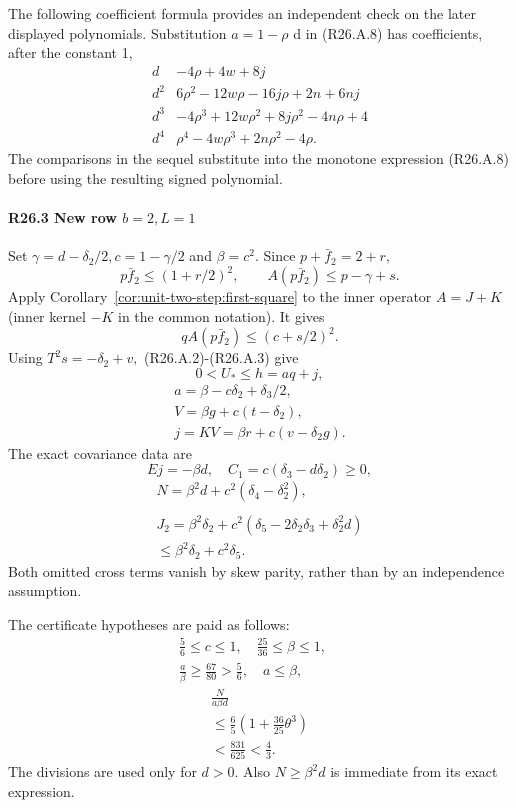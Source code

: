 The following coefficient formula provides an independent check on the
later displayed polynomials. Substitution \(a=1-\rho\) d in (R26.A.8) has
coefficients, after the constant 1,
\[
\begin{array}{c|l}
d&-4\rho+4w+8j\\
d^2&6\rho^2-12w\rho-16j\rho+2n+6nj\\
d^3&-4\rho^3+12w\rho^2+8j\rho^2-4n\rho+4\\
d^4&\rho^4-4w\rho^3+2n\rho^2-4\rho .
\end{array}                                                        \tag{R26.A.9}
\]
The comparisons in the sequel substitute into the monotone expression
(R26.A.8) before using the resulting signed polynomial.

\paragraph{R26.3 New row \(b=2,\allowbreak  L=1\)}\label{part:R26.3}

Set \(\gamma=d-\delta_2/2,\allowbreak  c=1-\gamma/2\) and \(\beta=c^2.\) Since \(p+\bar f_2=2+r,\allowbreak \)
\[
p\bar f_2\le(1+r/2)^2,\qquad
A(p\bar f_2)\le p-\gamma+s.
\]
Apply Corollary~\ref{cor:unit-two-step:first-square} to the inner
operator $A=J+K$ (inner kernel $-K$ in the common notation). It gives
\[
qA(p\bar f_2)\le(c+s/2)^2.
\]
Using \(T^2s=-\delta_2+v,\allowbreak \) (R26.A.2)-(R26.A.3) give
\[
0<U_*\le h=aq+j,
\]
\[
\begin{gathered}
a=\beta-c\delta_2+\delta_3/2,\quad\\
V=\beta g+c(t-\delta_2),\quad\\
j=KV=\beta r+c(v-\delta_2g).
\end{gathered}\tag{R26.A.10}
\]
The exact covariance data are
\[
Ej=-\beta d,\quad C_1=c(\delta_3-d\delta_2)\ge0,
\]
\[
\begin{gathered}
N=\beta^2d+c^2(\delta_4-\delta_2^2),\\
\quad\\
J_2=\beta^2\delta_2+c^2(\delta_5-2\delta_2\delta_3+\delta_2^2d)\\
\le\beta^2\delta_2+c^2\delta_5.
\end{gathered}
\]
Both omitted cross terms vanish by skew parity, rather than by an
independence assumption.

The certificate hypotheses are paid as follows:
\[
\begin{gathered}
\tfrac56\le c\le1,\quad\tfrac{25}{36}\le\beta\le1,\quad\\
\tfrac a\beta\ge\tfrac{67}{80}>\tfrac56,\quad a\le\beta,
\end{gathered}
\]
\[
\begin{gathered}
\frac{N}{a\beta d}\\
\le\frac65\left(1+\frac{36}{25}\theta^3\right)\\
<\frac{831}{625}<\frac43.
\end{gathered}
\]
The divisions are used only for \(d>0.\) Also \(N\ge \beta^2d\) is immediate from
its exact expression.

